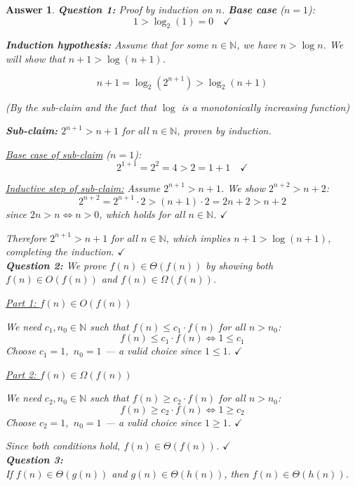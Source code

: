 \documentclass[a4paper]{article}
\theoremstyle{remarksStyle}
\theoremstyle{questionStyle}
\theoremstyle{answerStyle}
\newtheorem{answer}{Answer}
\begin{document}
\bigskip
\begin{answer}
\textbf {Question 1:}
\medskip
Proof by induction on $n$.
\noindent\textbf{Base case} ($n = 1$):
\[
    1 > \log_2(1) = 0 \quad \checkmark
\]

\noindent\textbf{Induction hypothesis:} Assume that for some $n \in \mathbb{N}$, we have $n > \log n$.
We will show that $n + 1 > \log(n + 1)$.

\medskip
\[ 
n+1 = \log_2({2^{n+1}}) > \log_2({n+1})
\]
\begin{center}
(By the sub-claim and the fact that $\log$ is a monotonically increasing function)
\end{center}

\noindent\textbf{Sub-claim:} $2^{n+1} > n + 1$ for all $n \in \mathbb{N}$, proven by induction.

\medskip
\noindent\underline{Base case of sub-claim} ($n = 1$):
\[
    2^{1+1} = 2^2 = 4 > 2 = 1 + 1 \quad \checkmark
\]

\noindent\underline{Inductive step of sub-claim:} Assume $2^{n+1} > n + 1$. We show $2^{n+2} > n + 2$:
\[
    2^{n+2} = 2^{n+1} \cdot 2
    > (n+1) \cdot 2
    = 2n + 2
    > n + 2
\]
since $2n > n \iff n > 0$, which holds for all $n \in \mathbb{N}$. $\checkmark$

\medskip
\noindent Therefore $2^{n+1} > n + 1$ for all $n \in \mathbb{N}$, which implies $n + 1 > \log(n+1)$,
completing the induction. $\checkmark$ \\
\medskip
\textbf {Question 2:}
\medskip
We prove $f(n) \in \Theta(f(n))$ by showing both $f(n) \in O(f(n))$ and $f(n) \in \Omega(f(n))$.

\medskip
\noindent\underline{Part 1: $f(n) \in O(f(n))$}

We need $c_1, n_0 \in \mathbb{N}$ such that $f(n) \leq c_1 \cdot f(n)$ for all $n > n_0$:
\[
    f(n) \leq c_1 \cdot f(n) \iff 1 \leq c_1
\]
Choose $c_1 = 1$,\ $n_0 = 1$ --- a valid choice since $1 \leq 1$. $\checkmark$

\medskip
\noindent\underline{Part 2: $f(n) \in \Omega(f(n))$}

We need $c_2, n_0 \in \mathbb{N}$ such that $f(n) \geq c_2 \cdot f(n)$ for all $n > n_0$:
\[
    f(n) \geq c_2 \cdot f(n) \iff 1 \geq c_2
\]
Choose $c_2 = 1$,\ $n_0 = 1$ --- a valid choice since $1 \geq 1$. $\checkmark$

\medskip
Since both conditions hold, $f(n) \in \Theta(f(n))$. $\checkmark$ \\
\medskip
\textbf {Question 3:} \\
\noindent If $f(n) \in \Theta(g(n))$ and $g(n) \in \Theta(h(n))$, then $f(n) \in \Theta(h(n))$.


\end{answer}
\end{document}
